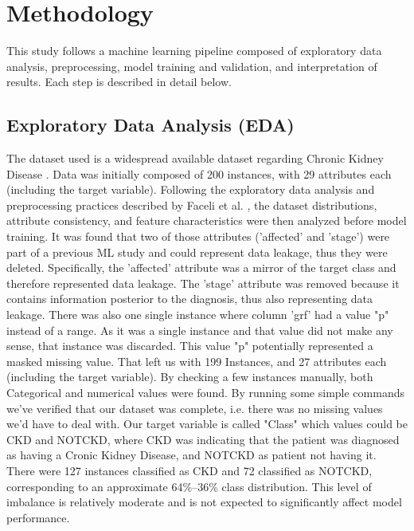 \section{Methodology}

This study follows a machine learning pipeline composed of exploratory data analysis,
preprocessing, model training and validation, and interpretation of results.
Each step is described in detail below.

\subsection{Exploratory Data Analysis (EDA)}

The dataset used is a widespread available dataset regarding Chronic Kidney Disease \cite{risk_factor_prediction_of_chronic_kidney_disease_857}.
Data was initially composed of 200 instances, with 29 attributes each (including the target variable).
Following the exploratory data analysis and preprocessing practices described by Faceli et al. \cite{faceli2011}, the dataset
distributions, attribute consistency, and feature characteristics were then analyzed before model training.
It was found that two of those attributes ('affected' and 'stage') were part of a previous ML study and could represent data leakage, thus they were deleted. Specifically, the 'affected' attribute was a mirror of the target class and therefore represented data leakage. The 'stage' attribute was removed because it contains information posterior to the diagnosis, thus also representing data leakage. There was also one single instance where column 'grf' had a value "p" instead of a range. As it was a single instance and that value did not make any sense, that instance was discarded. This value "p" potentially represented a masked missing value.
That left us with 199 Instances, and 27 attributes each (including the target variable). By checking a few instances manually, both Categorical and numerical values were found.
By running some simple commands we've verified that our dataset was complete, i.e. there was no missing values we'd have to deal with.
Our target variable is called "Class" which values could be CKD and NOTCKD, where CKD was indicating that the patient was diagnosed as having a Cronic Kidney Disease, and NOTCKD as patient not having it. There were 127 instances classified as CKD and 72 classified as NOTCKD, corresponding to an approximate 64\%–36\% class distribution. This level of imbalance is relatively moderate and is not expected to significantly affect model performance.
